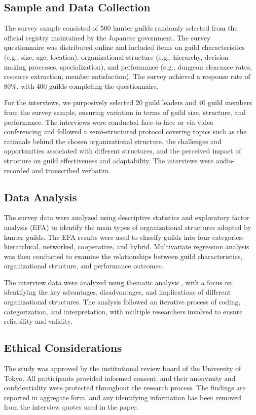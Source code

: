 \documentclass[12pt, a4paper]{article}
\begin{document}
\subsection{Sample and Data Collection}
The survey sample consisted of 500 hunter guilds randomly selected from the official registry maintained by the Japanese government. The survey questionnaire was distributed online and included items on guild characteristics (e.g., size, age, location), organizational structure (e.g., hierarchy, decision-making processes, specialization), and performance (e.g., dungeon clearance rates, resource extraction, member satisfaction). The survey achieved a response rate of 80\%, with 400 guilds completing the questionnaire.

For the interviews, we purposively selected 20 guild leaders and 40 guild members from the survey sample, ensuring variation in terms of guild size, structure, and performance. The interviews were conducted face-to-face or via video conferencing and followed a semi-structured protocol covering topics such as the rationale behind the chosen organizational structure, the challenges and opportunities associated with different structures, and the perceived impact of structure on guild effectiveness and adaptability. The interviews were audio-recorded and transcribed verbatim.

\subsection{Data Analysis}
The survey data were analyzed using descriptive statistics and exploratory factor analysis (EFA) to identify the main types of organizational structures adopted by hunter guilds. The EFA results were used to classify guilds into four categories: hierarchical, networked, cooperative, and hybrid. Multivariate regression analysis was then conducted to examine the relationships between guild characteristics, organizational structure, and performance outcomes.

The interview data were analyzed using thematic analysis \cite{Braun2006}, with a focus on identifying the key advantages, disadvantages, and implications of different organizational structures. The analysis followed an iterative process of coding, categorization, and interpretation, with multiple researchers involved to ensure reliability and validity.

\subsection{Ethical Considerations}
The study was approved by the institutional review board of the University of Tokyo. All participants provided informed consent, and their anonymity and confidentiality were protected throughout the research process. The findings are reported in aggregate form, and any identifying information has been removed from the interview quotes used in the paper.
\end{document}
